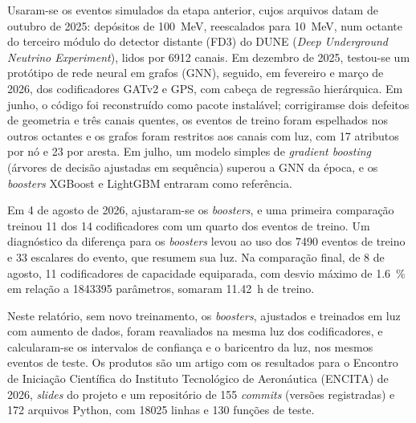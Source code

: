 \label{sec:resumo_atividades}

\mbox{Usaram-se} os eventos simulados da etapa anterior, cujos arquivos datam de outubro de 2025: depósitos de \qty{100}{\MeV}, reescalados para \qty{10}{\MeV}, num octante do terceiro módulo do detector distante (FD3) do DUNE (\textit{Deep Underground Neutrino Experiment}), lidos por \num{6912} canais. Em dezembro de 2025, \mbox{testou-se} um protótipo de rede neural em grafos (GNN), seguido, em fevereiro e março de 2026, dos codificadores GATv2 e GPS, com cabeça de regressão hierárquica. Em junho, o código foi reconstruído como pacote instalável; corrigiram\discretionary{-}{-}{-}se dois defeitos de geometria e três canais quentes, os eventos de treino foram espelhados nos outros octantes e os grafos foram restritos aos canais com luz, com \num{17} atributos por nó e \num{23} por aresta. Em julho, um modelo simples de \textit{gradient boosting} (árvores de decisão ajustadas em sequência) superou a GNN da época, e os \textit{boosters} XGBoost e LightGBM entraram como referência.

Em 4 de agosto de 2026, \mbox{ajustaram-se} os \textit{boosters}, e uma primeira comparação treinou \num{11} dos \num{14} codificadores com um quarto dos eventos de treino. Um diagnóstico da diferença para os \textit{boosters} levou ao uso dos \num{7490} eventos de treino e \num{33} escalares do evento, que resumem sua luz. Na comparação final, de 8 de agosto, \num{11} codificadores de capacidade equiparada, com desvio máximo de \qty{1.6}{\percent} em relação a \num{1843395} parâmetros, somaram \qty{11.42}{\hour} de treino.

Neste relatório, sem novo treinamento, os \textit{boosters}, ajustados e treinados em luz com aumento de dados, foram reavaliados na mesma luz dos codificadores, e \mbox{calcularam-se} os intervalos de confiança e o baricentro da luz, nos mesmos eventos de teste. Os produtos são um artigo com os resultados para o Encontro de Iniciação Científica do Instituto Tecnológico de Aeronáutica (ENCITA) de 2026, \textit{slides} do projeto e um repositório de \num{155} \textit{commits} (versões registradas) e \num{172} arquivos Python, com \num{18025} linhas e \num{130} funções de teste.


